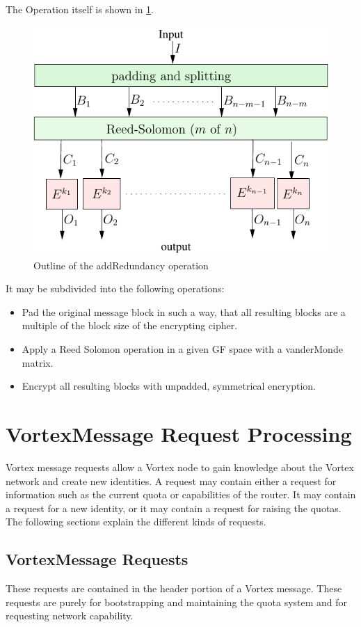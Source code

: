 The Operation itself is shown in \ref{fig:addRedundancyOperation}. 
\begin{figure}[ht]\centering
	\includegraphics[width=0.8\columnwidth]{inc/addRedundancyOp}
	\caption{Outline of the addRedundancy operation}
	\label{fig:addRedundancyOperation}
\end{figure}
It may be subdivided into the following operations:
\begin{itemize}
	\item Pad the original message block in such a way, that all resulting blocks are a multiple of the block size of the encrypting cipher.
	\item Apply a Reed Solomon operation in a given GF space with a vanderMonde matrix.
	\item Encrypt all resulting blocks with unpadded, symmetrical encryption.
\end{itemize}


\section{VortexMessage Request Processing}
Vortex message requests allow a Vortex node to gain knowledge about the Vortex network and create new identities. A request may contain either a request for information such as the current quota or capabilities of the router. It may contain a request for a new identity, or it may contain a request for raising the quotas. The following sections explain the different kinds of requests.

\subsection{VortexMessage Requests}
These requests are contained in the header portion of a Vortex message. These requests are purely for bootstrapping and maintaining the quota system and for requesting network capability.

